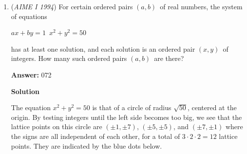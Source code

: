 \begin{enumerate}
 We see that the lines $y=-21,-20,\dots, -11$ and $y=11,12,\dots,21$ would complete several of the $882$ unit equilateral triangles. In fact, we can see that the lines $y=-21,-20,\dots,-11$ complete $1,2,(1+3),(2+4),(3+5),(4+6),\dots,(9+11)$ triangles, or $111$ triangles. The positive horizontal lines complete the same number of triangles, hence the answer is $882-2\cdot 111=\boxed{660}$.

 


 



\textbf{Solution 3 Elementary Counting}

Picturing the diagram in your head should give you an illustration similar to the one above. The distance from parallel sides of the center hexagon is 20 units, and by extending horizontal lines to the sides of the hexagon. This shows that for every side of the hexagon there are 10 spaces. Therefore the side length of the biggest triangle (imagine one of the overlapping triangles in the Star of David) is 30. The total number of triangles in the hexagon can be found by finding the number of triangles in the extended triangle and subtracting the 3 corner triangles. This gives us $30^2 - 10^2 - 10^2- 10^2 = 600$. That is the number of triangles in the hexagon. The remaining triangles form in groups of 10 on the exterior of each side. $600 + 6 * 10 = \boxed{660}$.

 
-jackshi2006

 


	\item (\textit{AIME I 1994}) For certain ordered pairs $(a,b)\,$ of real numbers, the system of equations


 $ax+by=1\,$
$x^2+y^2=50\,$

 has at least one solution, and each solution is an ordered pair $(x,y)\,$ of integers.  How many such ordered pairs $(a,b)\,$ are there?


 
 \textbf{Answer: }072



\textbf{Solution}

The equation $x^2+y^2=50$ is that of a circle of radius $\sqrt{50}$, centered at the origin. By testing integers until the left side becomes too big, we see that the lattice points on this circle are $(\pm1,\pm7)$, $(\pm5,\pm5)$, and $(\pm7,\pm1)$ where the signs are all independent of each other, for a total of $3\cdot 2\cdot 2=12$ lattice points. They are indicated by the blue dots below.


\end{enumerate}
